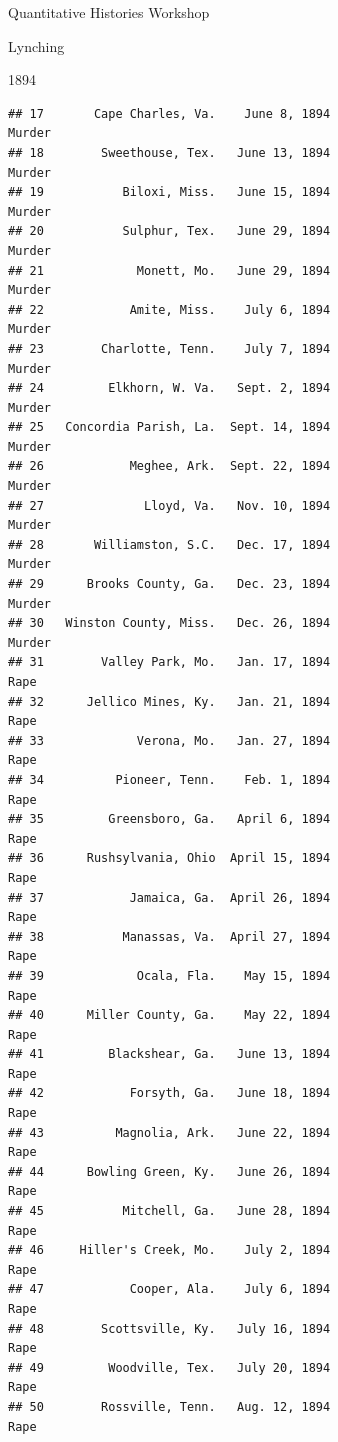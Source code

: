\documentclass[
  ignorenonframetext,
]{beamer}
\begin{document}
\begin{frame}[fragile]{Quantitative Histories Workshop}
\begin{block}{Lynching}
\begin{block}{1894}
\begin{verbatim}
## 17       Cape Charles, Va.    June 8, 1894                          Murder
## 18        Sweethouse, Tex.   June 13, 1894                          Murder
## 19           Biloxi, Miss.   June 15, 1894                          Murder
## 20           Sulphur, Tex.   June 29, 1894                          Murder
## 21             Monett, Mo.   June 29, 1894                          Murder
## 22            Amite, Miss.    July 6, 1894                          Murder
## 23        Charlotte, Tenn.    July 7, 1894                          Murder
## 24         Elkhorn, W. Va.   Sept. 2, 1894                          Murder
## 25   Concordia Parish, La.  Sept. 14, 1894                          Murder
## 26            Meghee, Ark.  Sept. 22, 1894                          Murder
## 27              Lloyd, Va.   Nov. 10, 1894                          Murder
## 28       Williamston, S.C.   Dec. 17, 1894                          Murder
## 29      Brooks County, Ga.   Dec. 23, 1894                          Murder
## 30   Winston County, Miss.   Dec. 26, 1894                          Murder
## 31        Valley Park, Mo.   Jan. 17, 1894                            Rape
## 32      Jellico Mines, Ky.   Jan. 21, 1894                            Rape
## 33             Verona, Mo.   Jan. 27, 1894                            Rape
## 34          Pioneer, Tenn.    Feb. 1, 1894                            Rape
## 35         Greensboro, Ga.   April 6, 1894                            Rape
## 36      Rushsylvania, Ohio  April 15, 1894                            Rape
## 37            Jamaica, Ga.  April 26, 1894                            Rape
## 38           Manassas, Va.  April 27, 1894                            Rape
## 39             Ocala, Fla.    May 15, 1894                            Rape
## 40      Miller County, Ga.    May 22, 1894                            Rape
## 41         Blackshear, Ga.   June 13, 1894                            Rape
## 42            Forsyth, Ga.   June 18, 1894                            Rape
## 43          Magnolia, Ark.   June 22, 1894                            Rape
## 44      Bowling Green, Ky.   June 26, 1894                            Rape
## 45           Mitchell, Ga.   June 28, 1894                            Rape
## 46     Hiller's Creek, Mo.    July 2, 1894                            Rape
## 47            Cooper, Ala.    July 6, 1894                            Rape
## 48        Scottsville, Ky.   July 16, 1894                            Rape
## 49         Woodville, Tex.   July 20, 1894                            Rape
## 50        Rossville, Tenn.   Aug. 12, 1894                            Rape

\end{verbatim}
\end{block}
\end{block}
\end{frame}
\end{document}

